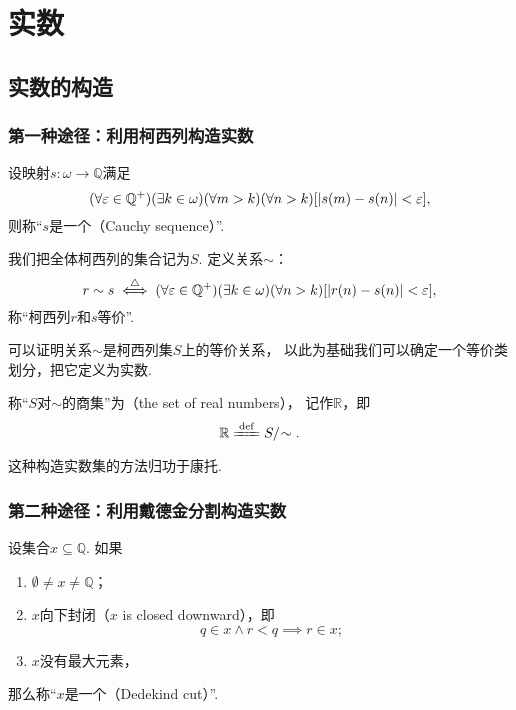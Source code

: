 \section{实数}
\subsection{实数的构造}
\subsubsection*{第一种途径：利用柯西列构造实数}
\begin{definition}
设映射\(s\colon \omega\to\mathbb{Q}\)满足\[
	(\forall\varepsilon\in\mathbb{Q}^+)(\exists k\in\omega)(\forall m>k)(\forall n>k)
	[\abs{s(m) - s(n)}<\varepsilon],
\]
则称“\(s\)是一个（Cauchy sequence）”.
\end{definition}

\begin{definition}
我们把全体柯西列的集合记为\(S\).
定义关系\(\sim\)：\[
	r \sim s
	\overset{\triangle}{\iff}
	(\forall\varepsilon\in\mathbb{Q}^+)(\exists k\in\omega)(\forall n>k)
	[\abs{r(n)-s(n)}<\varepsilon],
\]
称“柯西列\(r\)和\(s\)等价”.
\end{definition}

可以证明关系\(\sim\)是柯西列集\(S\)上的等价关系，
以此为基础我们可以确定一个等价类划分，把它定义为实数.
\begin{definition}
称“\(S\)对\(\sim\)的商集”为（the set of real numbers），
记作\(\mathbb{R}\)，即\[
	\mathbb{R} \defeq S/\kern-2pt\sim.
\]
\end{definition}
这种构造实数集的方法归功于康托.

\subsubsection*{第二种途径：利用戴德金分割构造实数}
\begin{definition}
设集合\(x \subseteq \mathbb{Q}\).
如果\begin{enumerate}
	\item \(\emptyset \neq x \neq \mathbb{Q}\)；
	\item \(x\)向下封闭（\(x\) is closed downward），即\[
		q \in x \land r < q \implies r \in x;
	\]
	\item \(x\)没有最大元素，
\end{enumerate}
那么称“\(x\)是一个（Dedekind cut）”.
\end{definition}

